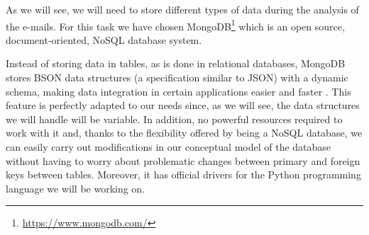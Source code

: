 As we will see, we will need to store different types of data during the analysis of the e-mails. For this task we have chosen MongoDB\footnote{\url{https://www.mongodb.com/}} which is an open source, document-oriented, NoSQL database system.

Instead of storing data in tables, as is done in relational databases, MongoDB stores BSON data structures (a specification similar to JSON) with a dynamic schema, making data integration in certain applications easier and faster \citep{gyHorodi2015comparative}. This feature is perfectly adapted to our needs since, as we will see, the data structures we will handle will be variable. In addition, no powerful resources required to work with it and, thanks to the flexibility offered by being a NoSQL database, we can easily carry out modifications in our conceptual model of the database without having to worry about problematic changes between primary and foreign keys between tables. Moreover, it has official drivers for the Python programming language we will be working on.